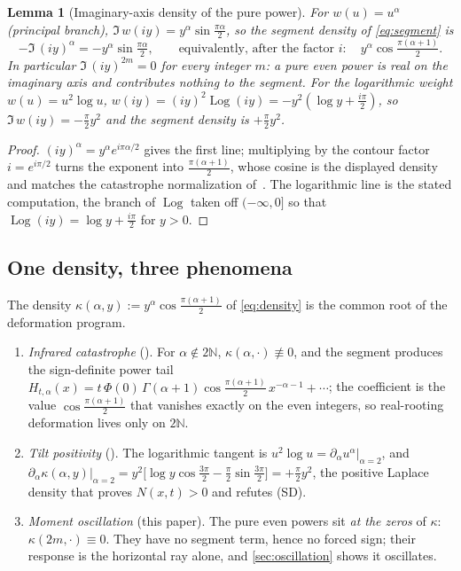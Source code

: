 \documentclass[11pt,reqno]{amsart}
\theoremstyle{plain}
\newtheorem{lemma}[theorem]{Lemma}
\theoremstyle{definition}
\theoremstyle{remark}
\newcommand{\N}{\mathbb N}
\DeclareMathOperator{\Log}{Log}
\begin{document}
\begin{lemma}[Imaginary-axis density of the pure power]\label{lem:density}
For $w(u)=u^\alpha$ (principal branch), $\Im\,w(iy)=y^\alpha
\sin\tfrac{\pi\alpha}2$, so the segment density of \eqref{eq:segment} is
\begin{equation}\label{eq:density}
  -\Im\,(iy)^\alpha=-y^\alpha\sin\tfrac{\pi\alpha}2,
  \qquad\text{equivalently, after the factor }i:\quad
  y^\alpha\cos\tfrac{\pi(\alpha+1)}2 .
\end{equation}
In particular $\Im\,(iy)^{2m}=0$ for every integer $m$: a pure even power is
real on the imaginary axis and contributes \emph{nothing} to the segment.
For the logarithmic weight $w(u)=u^2\log u$,
$w(iy)=(iy)^2\Log(iy)=-y^2(\log y+\tfrac{i\pi}2)$, so $\Im\,w(iy)=-\tfrac\pi2
y^2$ and the segment density is $+\tfrac\pi2 y^2$.
\end{lemma}

\begin{proof}
$(iy)^\alpha=y^\alpha e^{i\pi\alpha/2}$ gives the first line; multiplying by
the contour factor $i=e^{i\pi/2}$ turns the exponent into
$\tfrac{\pi(\alpha+1)}2$, whose cosine is the displayed density and matches
the catastrophe normalization of~\cite{Fsymbol}. The logarithmic line is
the stated computation, the branch of $\Log$ taken off $(-\infty,0]$ so that
$\Log(iy)=\log y+\tfrac{i\pi}2$ for $y>0$.
\end{proof}

\subsection{One density, three phenomena}
The density $\kappa(\alpha,y):=y^\alpha\cos\tfrac{\pi(\alpha+1)}2$ of
\eqref{eq:density} is the common root of the deformation program.

\begin{enumerate}
\item[(i)] \emph{Infrared catastrophe} (\cite{Fsymbol}). For
$\alpha\notin2\N$, $\kappa(\alpha,\cdot)\not\equiv0$, and the segment
produces the sign-definite power tail
$H_{t,\alpha}(x)=t\,\Phi(0)\,\Gamma(\alpha+1)\cos\tfrac{\pi(\alpha+1)}2\,
x^{-\alpha-1}+\cdots$; the coefficient is the value
$\cos\tfrac{\pi(\alpha+1)}2$ that vanishes exactly on the even integers, so
real-rooting deformation lives only on $2\N$.
\item[(ii)] \emph{Tilt positivity} (\cite{Fsymbol}). The logarithmic tangent
is $u^2\log u=\partial_\alpha u^\alpha|_{\alpha=2}$, and
$\partial_\alpha\kappa(\alpha,y)|_{\alpha=2}
=y^2\bigl[\log y\cos\tfrac{3\pi}2-\tfrac\pi2\sin\tfrac{3\pi}2\bigr]
=+\tfrac\pi2y^2$, the positive Laplace density that proves $N(x,t)>0$ and
refutes (SD).
\item[(iii)] \emph{Moment oscillation} (this paper). The pure even powers
sit \emph{at the zeros} of $\kappa$: $\kappa(2m,\cdot)\equiv0$. They have no
segment term, hence no forced sign; their response is the horizontal ray
alone, and \cref{sec:oscillation} shows it oscillates.
\end{enumerate}
\end{document}

